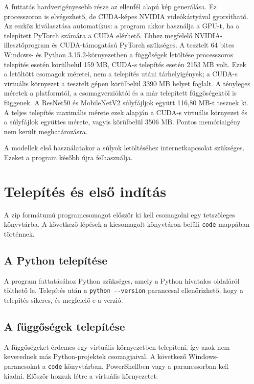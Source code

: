 A futtatás hardverigényesebb része az ellenfél alapú kép generálása. 
Ez processzoron is elvégezhető, de CUDA-képes NVIDIA videókártyával gyorsítható. 
Az eszköz kiválasztása automatikus: a program akkor használja a GPU-t, ha a telepített PyTorch számára a CUDA elérhető. 
Ehhez megfelelő NVIDIA-illesztőprogram és CUDA-támogatású PyTorch szükséges. 
A tesztelt 64 bites Windows- és Python 3.15.2-környezetben a függőségek letöltése processzoros telepítés esetén 
körülbelül 159 MB, CUDA-s telepítés esetén 2153 MB volt. 
Ezek a letöltött csomagok méretei, nem a telepítés utáni tárhelyigények; a CUDA-s virtuális környezet a tesztelt gépen 
körülbelül 3390 MB helyet foglalt. 
A tényleges méretek a platformtól, a csomagverzióktól és a már telepített függőségektől is függenek. 
A ResNet50 és MobileNetV2 súlyfájljok együtt 116,80 MB-t tesznek ki.
A teljes telepítés maximális mérete ezek alapján a CUDA-s virtuális környezet és a súlyfájlok együttes mérete, vagyis körülbelül 3506 MB.
Pontos memóriaigény nem került meghatározásra. 

A modellek első használatakor a súlyok letöltéséhez internetkapcsolat szükséges. 
Ezeket a program később újra felhasználja. 

\section{Telepítés és első indítás}
A zip formátumú programcsomagot először ki kell csomagolni egy tetszőleges könyvtárba. 
A következő lépések a kicsomagolt könyvtáron belüli \texttt{code} mappában történnek. 

\subsection{A Python telepítése}
A program futtatásához Python szükséges, amely a Python hivatalos oldaláról tölthető le. 
Telepítés után a \verb|python --version| paranccsal ellenőrizhető, hogy a telepítés sikeres, és megfelelő-e a verzió. 

\subsection{A függőségek telepítése}
A függőségeket érdemes egy virtuális környezetben telepíteni, így azok nem keverednek más Python-projektek csomagjaival. 
A következő Windows-parancsokat a \texttt{code} könyvtárban, PowerShellben vagy a parancssorban kell kiadni. 
Először hozzuk létre a virtuális környezetet: 

